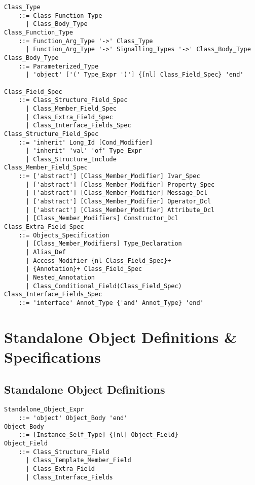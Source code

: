 \grammar\begin{lstlisting}
Class_Type
    ::= Class_Function_Type
      | Class_Body_Type
Class_Function_Type
    ::= Function_Arg_Type '->' Class_Type
      | Function_Arg_Type '->' Signalling_Types '->' Class_Body_Type
Class_Body_Type
    ::= Parameterized_Type
      | 'object' ['(' Type_Expr ')'] {[nl] Class_Field_Spec} 'end'

Class_Field_Spec
    ::= Class_Structure_Field_Spec
      | Class_Member_Field_Spec
      | Class_Extra_Field_Spec
      | Class_Interface_Fields_Spec
Class_Structure_Field_Spec
    ::= 'inherit' Long_Id [Cond_Modifier]
      | 'inherit' 'val' 'of' Type_Expr
      | Class_Structure_Include
Class_Member_Field_Spec
    ::= ['abstract'] [Class_Member_Modifier] Ivar_Spec
      | ['abstract'] [Class_Member_Modifier] Property_Spec
      | ['abstract'] [Class_Member_Modifier] Message_Dcl
      | ['abstract'] [Class_Member_Modifier] Operator_Dcl
      | ['abstract'] [Class_Member_Modifier] Attribute_Dcl
      | [Class_Member_Modifiers] Constructor_Dcl
Class_Extra_Field_Spec
    ::= Objects_Specification
      | [Class_Member_Modifiers] Type_Declaration
      | Alias_Def
      | Access_Modifier {nl Class_Field_Spec}+
      | {Annotation}+ Class_Field_Spec
      | Nested_Annotation
      | Class_Conditional_Field(Class_Field_Spec)
Class_Interface_Fields_Spec
    ::= 'interface' Annot_Type {'and' Annot_Type} 'end'
\end{lstlisting}





\section{Standalone Object Definitions \& Specifications}
\label{sec:standalone-object-defs-specs}

\subsection{Standalone Object Definitions}
\label{sec:standalone-object-defs}

\grammar\begin{lstlisting}
Standalone_Object_Expr
    ::= 'object' Object_Body 'end'
Object_Body
    ::= [Instance_Self_Type] {[nl] Object_Field}
Object_Field
    ::= Class_Structure_Field
      | Class_Template_Member_Field
      | Class_Extra_Field
      | Class_Interface_Fields
\end{lstlisting}

